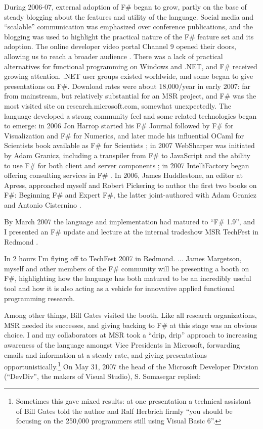 \documentclass[acmsmall,screen]{acmart}
\begin{document}
During 2006-07, external adoption of F\# began to grow, partly on the base of steady blogging about the features and utility of the language.
Social media and “scalable” communication was emphasized over conference publications, and the blogging was used to highlight the practical
nature of the F\# feature set and its adoption. The online developer video portal Channel 9 opened their doors, allowing us to reach a broader
audience \citep{RefChan9}.
There was a lack of practical alternatives for functional programming on Windows and .NET, and F\# received growing attention.
.NET user groups existed worldwide, and some began to give presentations on F\#. Download rates were about 18,000/year in early 2007:
far from mainstream, but relatively substantial for an MSR project, and F\# was the most visited site on research.microsoft.com, somewhat
unexpectedly. The language developed a strong community feel and some related technologies began to emerge: in 2006 Jon Harrop started
his F\# Journal followed by F\# for Visualization and F\# for Numerics, and later made his influential OCaml for Scientists book available
as F\# for Scientists \citep{RefHarropScientists, HarrpBook}; in 2007 WebSharper was initiated by Adam Granicz, including a
transpiler from F\# to JavaScript and the ability to use F\# for both client and server
components \citep{Bjornson2010, Granicz2011, Granicz2015}; in 2007 IntelliFactory began offering consulting services
in F\# \citep{PeakGranicz2009, RefIntelliFactory}.
In 2006, James Huddlestone, an editor at Apress, approached myself and Robert Pickering to author the first two
books on F\#: Beginning F\# and Expert F\#, the latter joint-authored with Adam Granicz and Antonio Cisternino \citep{RefExpertFSharpDraft}.

By March 2007 the language and implementation had matured to “F\# 1.9”, and I presented an F\# update and lecture at the internal tradeshow MSR TechFest in Redmond \citep{RefF19}.

\begin{verbquote}
In 2 hours I'm flying off to TechFest 2007 in Redmond. ... James Margetson, myself and other members of the F# community will be presenting a booth on F#, highlighting how the language has both matured to be an incredibly useful tool and how it is also acting as a vehicle for innovative applied functional programming research.
\end{verbquote}



Among other things, Bill Gates visited the booth. Like all research organizations, MSR needed its successes, and
giving backing to F\# at this stage was an obvious choice. I and my collaborators at MSR took a “drip, drip” approach
to increasing awareness of the language amongst Vice Presidents in Microsoft, forwarding emails and information at
a steady rate, and giving presentations opportunistically.\footnote{Sometimes this gave mixed results: at one presentation
a technical assistant of Bill Gates told the author and Ralf Herbrich firmly “you should be focusing on the 250,000 programmers still using Visual Basic 6”.}   On May 31,
2007 the head of the Microsoft Developer Division (“DevDiv”, the makers of Visual Studio), S. Somasegar replied:
\end{document}
